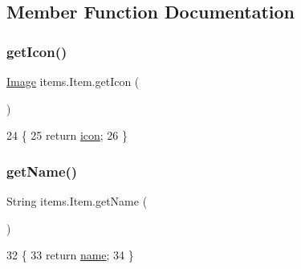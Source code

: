 \subsection{Member Function Documentation}
\mbox{\label{classitems_1_1_item_a61a856e9cd34dced660338643dcd77c6}} 
\subsubsection{\texorpdfstring{get\+Icon()}{getIcon()}}
{\footnotesize\ttfamily \mbox{\hyperlink{classorg_1_1newdawn_1_1slick_1_1_image}{Image}} items.\+Item.\+get\+Icon (\begin{DoxyParamCaption}{ }\end{DoxyParamCaption})\hspace{0.3cm}{\ttfamily [inline]}}


\begin{DoxyCode}
24                            \{
25         \textcolor{keywordflow}{return} \mbox{\hyperlink{classitems_1_1_item_afa445ad011d48c3455b0c04bec2581f9}{icon}};
26     \}
\end{DoxyCode}
\mbox{\label{classitems_1_1_item_a07354b033d3a7fc29ededaaaa36a917d}} 
\subsubsection{\texorpdfstring{get\+Name()}{getName()}}
{\footnotesize\ttfamily String items.\+Item.\+get\+Name (\begin{DoxyParamCaption}{ }\end{DoxyParamCaption})\hspace{0.3cm}{\ttfamily [inline]}}


\begin{DoxyCode}
32                             \{
33         \textcolor{keywordflow}{return} \mbox{\hyperlink{classitems_1_1_item_a086327df1ba046bbbe3fa2f753226d73}{name}};
34     \}
\end{DoxyCode}
\mbox{\label{classitems_1_1_item_afa9c7e68e0aded0261c198baa252142c}} 
